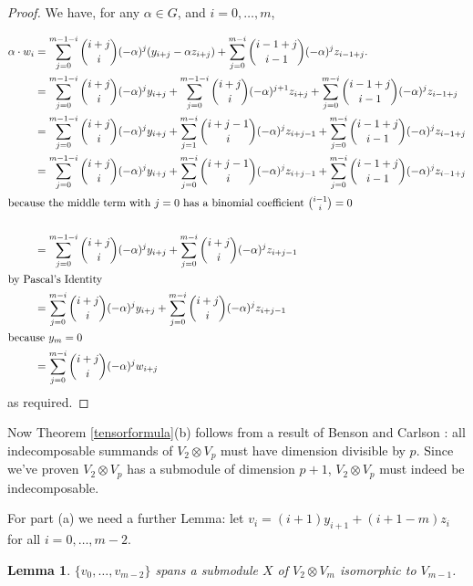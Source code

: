 \documentclass[a4paper]{amsart}
\newtheorem{Lemma}{Lemma}[section]
\theoremstyle{definition}
\theoremstyle{remark}
\theoremstyle{Acknowledgments}
\begin{document}
\begin{proof}
We have, for any $\alpha \in G$, and $i=0, \ldots, m$,

\begin{align*} \alpha \cdot w_i &=  \sum_{j=0}^{m-1-i}\binom{i+j}{i}(-\alpha)^j (y_{i+j} - \alpha z_{i+j}) + \sum_{j=0}^{m-i}\binom{i-1+j}{i-1}(-\alpha)^j z_{i-1+j}.\\
 &=  \sum_{j=0}^{m-1-i}\binom{i+j}{i}(-\alpha)^j y_{i+j} +  \sum_{j=0}^{m-1-i}\binom{i+j}{i}(-\alpha)^{j+1} z_{i+j} + \sum_{j=0}^{m-i}\binom{i-1+j}{i-1}(-\alpha)^j z_{i-1+j}\\
 &=  \sum_{j=0}^{m-1-i}\binom{i+j}{i}(-\alpha)^j y_{i+j} +  \sum_{j=1}^{m-i}\binom{i+j-1}{i}(-\alpha)^{j}  z_{i+j-1} + \sum_{j=0}^{m-i}\binom{i-1+j}{i-1}(-\alpha)^j z_{i-1+j}\\
 &=  \sum_{j=0}^{m-1-i}\binom{i+j}{i}(-\alpha)^j y_{i+j} +  \sum_{j=0}^{m-i}\binom{i+j-1}{i}(-\alpha)^{j}  z_{i+j-1} + \sum_{j=0}^{m-i}\binom{i-1+j}{i-1}(-\alpha)^j z_{i-1+j}\\
\intertext{because the middle term with $j=0$ has a binomial coefficient $\binom{i-1}{i} = 0$}\\
 &=  \sum_{j=0}^{m-1-i}\binom{i+j}{i}(-\alpha)^j y_{i+j} +  \sum_{j=0}^{m-i}\binom{i+j}{i}(-\alpha)^{j}  z_{i+j-1}\\
\intertext{by Pascal's Identity}
&=  \sum_{j=0}^{m-i}\binom{i+j}{i}(-\alpha)^j y_{i+j} +  \sum_{j=0}^{m-i}\binom{i+j}{i}(-\alpha)^{j}  z_{i+j-1}\\
\intertext{because $y_m=0$}
&= \sum_{j=0}^{m-i}\binom{i+j}{i}(-\alpha)^j w_{i+j}
\end{align*}
as required.
\end{proof}

Now Theorem \ref{tensorformula}(b) follows from a result of Benson and Carlson \cite[Theorem~2.1]{BensonCarlson}: all indecomposable summands of $V_2 \otimes V_p$ must have dimension divisible by $p$. Since we've proven $V_2 \otimes V_p$ has a submodule of dimension $p+1$, $V_2 \otimes V_p$ must indeed be indecomposable.

For part (a) we need a further Lemma:  let $v_i = (i+1)y_{i+1} + (i+1-m)z_i$ for all $i=0, \ldots, m-2$. %

 \begin{Lemma}
$\{v_0, \ldots, v_{m-2}\}$ spans a submodule $X$ of $V_2 \otimes V_m$ isomorphic to $V_{m-1}$.
\end{Lemma}
\end{document}

